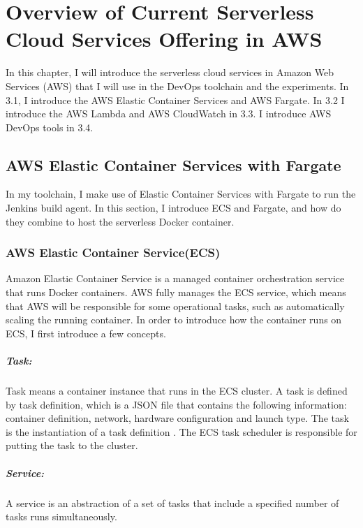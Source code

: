 \chapter{Overview of Current Serverless Cloud Services Offering in AWS}
In this chapter, I will introduce the serverless cloud services in Amazon Web Services (AWS) that I will use in the DevOps toolchain and the experiments.
 In 3.1, I introduce the AWS Elastic Container Services and AWS Fargate. In 3.2 I introduce the AWS Lambda and AWS CloudWatch in 3.3. I introduce AWS DevOps tools in 3.4.
\section{AWS Elastic Container Services with Fargate}
In my toolchain, I make use of Elastic Container Services with Fargate to run the Jenkins build agent. In this section, I introduce ECS and Fargate, and how do they combine to host the serverless Docker container.
\subsection{AWS Elastic Container Service(ECS)}
Amazon Elastic Container Service is a managed container orchestration service that runs Docker containers. AWS fully manages the ECS service, which means that AWS will be responsible for some operational tasks, such as automatically scaling the running container. In order to introduce how the container runs on ECS, I first introduce a few concepts.
\paragraph{Task:} Task means a container instance that runs in the ECS cluster. A task is defined by task definition, which is a JSON file that contains the following information: container definition, network, hardware configuration and launch type. The task is the instantiation of a task definition \cite{WhatisAm71:online}. The ECS task scheduler is responsible for putting the task to the cluster. 
\paragraph{Service:} A service is an abstraction of a set of tasks that include a specified number of tasks runs simultaneously.
